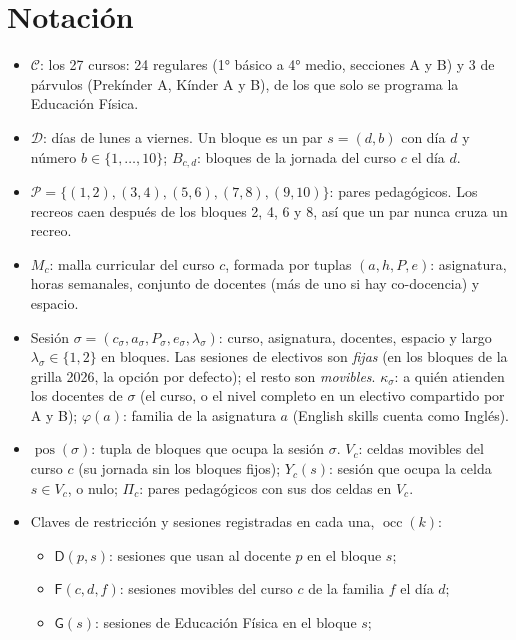 \documentclass{article}
\newcommand{\clave}[1]{\mathsf{#1}}          %
\begin{document}
\section*{Notación}
\begin{itemize}
    \item $\mathcal{C}$: los 27 cursos: 24 regulares (1° básico a 4° medio, secciones A y B)
          y 3 de párvulos (Prekínder A, Kínder A y B), de los que solo se programa la Educación Física.
    \item $\mathcal{D}$: días de lunes a viernes. Un bloque es un par $s = (d, b)$ con día
          $d$ y número $b \in \{1,\dots,10\}$; $B_{c,d}$: bloques de la jornada del curso $c$ el día $d$.
    \item $\mathcal{P} = \{(1,2), (3,4), (5,6), (7,8), (9,10)\}$: pares pedagógicos. Los recreos
          caen después de los bloques 2, 4, 6 y 8, así que un par nunca cruza un recreo.
    \item $M_c$: malla curricular del curso $c$, formada por tuplas $(a, h, P, e)$: asignatura,
          horas semanales, conjunto de docentes (más de uno si hay co-docencia) y espacio.
    \item Sesión $\sigma = (c_\sigma, a_\sigma, P_\sigma, e_\sigma, \lambda_\sigma)$: curso, asignatura,
          docentes, espacio y largo $\lambda_\sigma \in \{1, 2\}$ en bloques. Las sesiones de electivos
          son \emph{fijas} (en los bloques de la grilla 2026, la opción por defecto); el resto son
          \emph{movibles}.
          $\kappa_\sigma$: a quién atienden los docentes de $\sigma$ (el curso, o el nivel completo en
          un electivo compartido por A y B); $\varphi(a)$: familia de la asignatura $a$
          (English skills cuenta como Inglés).
    \item $\operatorname{pos}(\sigma)$: tupla de bloques que ocupa la sesión $\sigma$.
          $V_c$: celdas movibles del curso $c$ (su jornada sin los bloques fijos);
          $Y_c(s)$: sesión que ocupa la celda $s \in V_c$, o nulo;
          $\Pi_c$: pares pedagógicos con sus dos celdas en $V_c$.
    \item Claves de restricción y sesiones registradas en cada una, $\operatorname{occ}(k)$:
          \begin{itemize}
              \item $\clave{D}(p, s)$: sesiones que usan al docente $p$ en el bloque $s$;
              \item $\clave{F}(c, d, f)$: sesiones movibles del curso $c$ de la familia $f$ el día $d$;
              \item $\clave{G}(s)$: sesiones de Educación Física en el bloque $s$;

\end{itemize}
\end{itemize}
\end{document}
